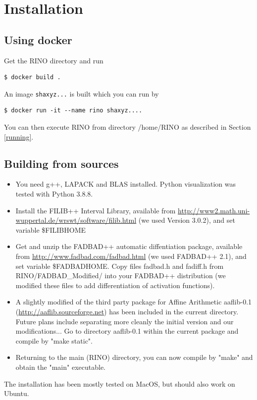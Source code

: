 \documentclass{article}
\begin{document}
\section{Installation}

\subsection{Using docker}

Get the RINO directory and run 
\begin{verbatim}
$ docker build .
\end{verbatim}
An image \texttt{shaxyz...}  is built which you can run by 
\begin{verbatim}
$ docker run -it --name rino shaxyz.... 
\end{verbatim}
You can then execute RINO from directory /home/RINO as described in Section \ref{running}.

\subsection{Building from sources}


\begin{itemize}[noitemsep]

\item You need g++, LAPACK and BLAS installed. Python visualization was tested with Python 3.8.8. 

\item Install the FILIB++ Interval Library, available from \url{http://www2.math.uni-wuppertal.de/wrswt/software/filib.html} (we used Version 3.0.2), and set variable \$FILIBHOME

\item Get and unzip the FADBAD++ automatic diffentiation package, available from \url{http://www.fadbad.com/fadbad.html} (we used FADBAD++ 2.1), and set variable \$FADBADHOME.
Copy files fadbad.h and fadiff.h from RINO/FADBAD\_Modified/ into your FADBAD++ distribution (we modified these files to add differentiation of activation functions).

\item A slightly modified of the third party package for Affine Arithmetic aaflib-0.1 (\url{http://aaflib.sourceforge.net}) has been included in the current directory. 
Future plans include separating more cleanly the initial version and our modifications...
Go to directory aaflib-0.1 within the current package and compile by "make static". 

\item Returning to the main (RINO) directory, you can now compile by "make" and obtain the "main" executable. 
\end{itemize}
The installation has been mostly tested on MacOS, but should also work on Ubuntu. 
\end{document}

